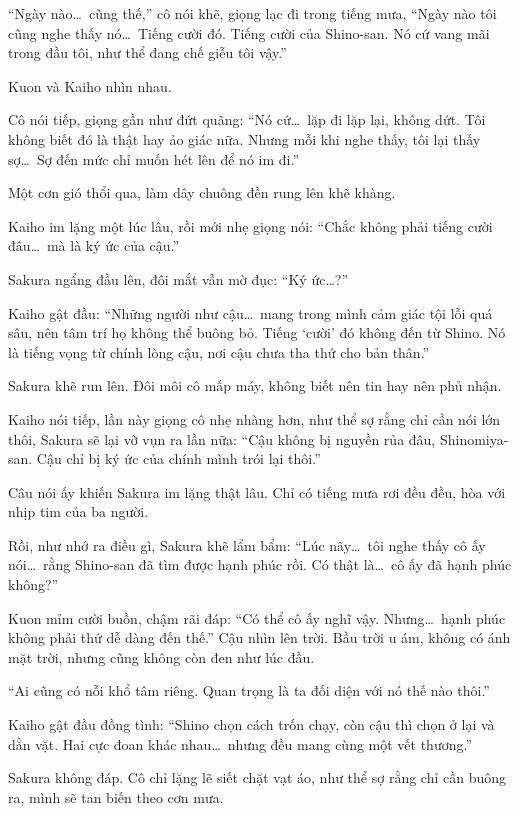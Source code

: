 \documentclass[../main.tex]{subfiles}
\begin{document}
``Ngày nào\dots\ cũng thế,'' cô nói khẽ, giọng lạc đi trong tiếng mưa, ``Ngày nào tôi cũng nghe thấy nó\dots\ Tiếng cười đó. Tiếng cười của Shino-san. Nó cứ vang mãi trong đầu tôi, như thể đang chế giễu tôi vậy.''

Kuon và Kaiho nhìn nhau.

Cô nói tiếp, giọng gần như đứt quãng: ``Nó cứ\dots\ lặp đi lặp lại, không dứt. Tôi không biết đó là thật hay ảo giác nữa. Nhưng mỗi khi nghe thấy, tôi lại thấy sợ\dots\ Sợ đến mức chỉ muốn hét lên để nó im đi.''

Một cơn gió thổi qua, làm dây chuông đền rung lên khẽ khàng.

Kaiho im lặng một lúc lâu, rồi mới nhẹ giọng nói: ``Chắc không phải tiếng cười đâu\dots\ mà là ký ức của cậu.''

Sakura ngẩng đầu lên, đôi mắt vẫn mờ đục: ``Ký ức\dots?''

Kaiho gật đầu: ``Những người như cậu\dots\ mang trong mình cảm giác tội lỗi quá sâu, nên tâm trí họ không thể buông bỏ. Tiếng `cười' đó không đến từ Shino. Nó là tiếng vọng từ chính lòng cậu, nơi cậu chưa tha thứ cho bản thân.''

Sakura khẽ run lên. Đôi môi cô mấp máy, không biết nên tin hay nên phủ nhận.

Kaiho nói tiếp, lần này giọng cô nhẹ nhàng hơn, như thể sợ rằng chỉ cần nói lớn thôi, Sakura sẽ lại vỡ vụn ra lần nữa: ``Cậu không bị nguyền rủa đâu, Shinomiya-san. Cậu chỉ bị ký ức của chính mình trói lại thôi.''

Câu nói ấy khiến Sakura im lặng thật lâu. Chỉ có tiếng mưa rơi đều đều, hòa với nhịp tim của ba người.

Rồi, như nhớ ra điều gì, Sakura khẽ lẩm bẩm: ``Lúc nãy\dots\ tôi nghe thấy cô ấy nói\dots\ rằng Shino-san đã tìm được hạnh phúc rồi. Có thật là\dots\ cô ấy đã hạnh phúc không?''

Kuon mỉm cười buồn, chậm rãi đáp: ``Có thể cô ấy nghĩ vậy. Nhưng\dots\ hạnh phúc không phải thứ dễ dàng đến thế.'' Cậu nhìn lên trời. Bầu trời u ám, không có ánh mặt trời, nhưng cũng không còn đen như lúc đầu.

``Ai cũng có nỗi khổ tâm riêng. Quan trọng là ta đối diện với nó thế nào thôi.''

Kaiho gật đầu đồng tình: ``Shino chọn cách trốn chạy, còn cậu thì chọn ở lại và dằn vặt. Hai cực đoan khác nhau\dots\ nhưng đều mang cùng một vết thương.''

Sakura không đáp. Cô chỉ lặng lẽ siết chặt vạt áo, như thể sợ rằng chỉ cần buông ra, mình sẽ tan biến theo cơn mưa.
\end{document}
